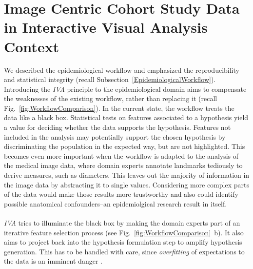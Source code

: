\documentclass[journal]{style/vgtc} 			          %
\begin{document}
\section{Image Centric Cohort Study Data in Interactive Visual Analysis Context} \label{Image Centric Cohort Study Data in Interactive Visual Analysis Context}
We described the epidemiological workflow and emphasized the reproducibility and statistical integrity (recall Subsection~\ref{EpidemiologicalWorkflow}).
%
%
Introducing the \emph{IVA} principle to the epidemiological domain aims to compensate the weaknesses of the existing workflow, rather than replacing it (recall Fig.~\ref{fig:WorkflowComparison}).
%
In the current state, the workflow treats the data like a black box.
%
Statistical tests on features associated to a hypothesis yield a value for deciding whether the data supports the hypothesis.
%
Features not included in the analysis may potentially support the chosen hypothesis by discriminating the population in the expected way, but are not highlighted.
%
This becomes even more important when the workflow is adapted to the analysis of the medical image data, where
domain experts annotate landmarks tediously to derive measures, such as diameters.
%
This leaves out the majority of information in the image data by abstracting it to single values.
%
%
Considering more complex parts of the data would make those results more trustworthy and also could identify possible anatomical confounders--an epidemiolgical research result in itself.
\\\\
\emph{IVA} tries to illuminate the black box by making the domain experts part of an iterative feature selection process (see Fig.~\ref{fig:WorkflowComparison}~b).
%
It also aims to project back into the hypothesis formulation step to amplify hypothesis generation.
%
This has to be handled with care, since \emph{overfitting} of expectations to the data is an imminent danger \cite{Turkay2013}.
\end{document}
